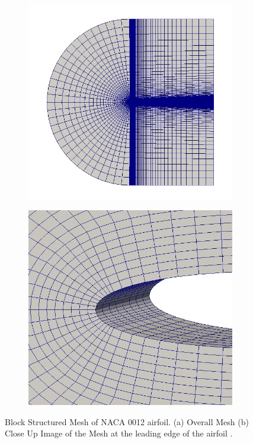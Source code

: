 \begin{figure}
  \begin{subfigure}{0.5\linewidth}
    \centering
    \includegraphics[width=\linewidth]{img/intro/structured.jpg}
    \caption{}
  \end{subfigure}%
  \begin{subfigure}{0.5\linewidth}
    \centering
    \includegraphics[width=\linewidth]{img/intro/structuredCloseUp.jpg}
    \caption{}
  \end{subfigure}%
  \caption{Block Structured Mesh of NACA 0012 airfoil. (a) Overall Mesh (b) Close Up Image of the Mesh at the leading edge of the airfoil \cite{HOPR}.}
  \label{fig-block-structured-mesh}
\end{figure}

